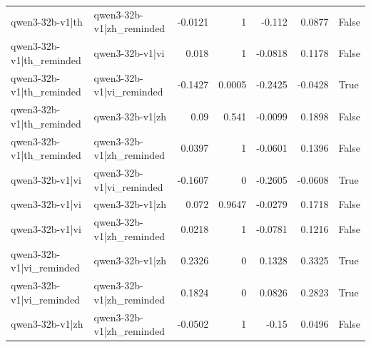 \begin{table}
\begin{tabular}{l l r r r r l}
qwen3-32b-v1|th & qwen3-32b-v1|zh_reminded & -0.0121 & 1 & -0.112 & 0.0877 & False \\
qwen3-32b-v1|th_reminded & qwen3-32b-v1|vi & 0.018 & 1 & -0.0818 & 0.1178 & False \\
qwen3-32b-v1|th_reminded & qwen3-32b-v1|vi_reminded & -0.1427 & 0.0005 & -0.2425 & -0.0428 & True \\
qwen3-32b-v1|th_reminded & qwen3-32b-v1|zh & 0.09 & 0.541 & -0.0099 & 0.1898 & False \\
qwen3-32b-v1|th_reminded & qwen3-32b-v1|zh_reminded & 0.0397 & 1 & -0.0601 & 0.1396 & False \\
qwen3-32b-v1|vi & qwen3-32b-v1|vi_reminded & -0.1607 & 0 & -0.2605 & -0.0608 & True \\
qwen3-32b-v1|vi & qwen3-32b-v1|zh & 0.072 & 0.9647 & -0.0279 & 0.1718 & False \\
qwen3-32b-v1|vi & qwen3-32b-v1|zh_reminded & 0.0218 & 1 & -0.0781 & 0.1216 & False \\
qwen3-32b-v1|vi_reminded & qwen3-32b-v1|zh & 0.2326 & 0 & 0.1328 & 0.3325 & True \\
qwen3-32b-v1|vi_reminded & qwen3-32b-v1|zh_reminded & 0.1824 & 0 & 0.0826 & 0.2823 & True \\
qwen3-32b-v1|zh & qwen3-32b-v1|zh_reminded & -0.0502 & 1 & -0.15 & 0.0496 & False \\
\bottomrule
\end{tabular}
\end{table}
